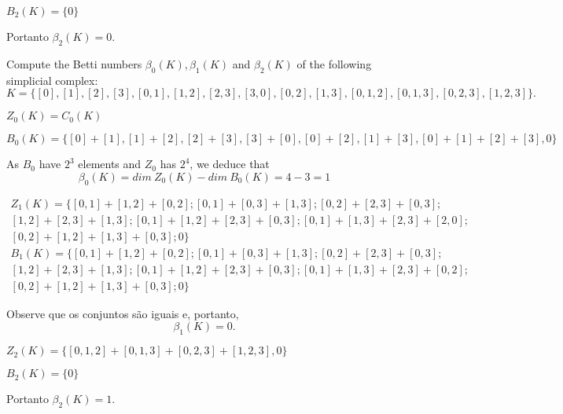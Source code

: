 $B_2(K) = \{0\}$

Portanto $\beta_2(K) = 0$. 

\noindent\linia

\begin{exercise}
    Compute the Betti numbers $\beta_0(K), \beta_1(K)$ and $\beta_2(K)$ of the
    following simplicial complex:
    $$
    K = \{[0], [1], [2], [3], [0, 1], [1, 2], [2, 3], [3, 0], [0, 2], [1, 3], [0, 1, 2], [0, 1, 3], [0, 2, 3], [1, 2, 3]\}.
    $$
\end{exercise}

$Z_0(K) = C_0(K)$

$B_0(K) = \{[0] + [1], [1] + [2], [2] + [3], [3] + [0], [0] + [2], [1] + [3],
[0] + [1] + [2] + [3], 0\}$

As $B_0$ have $2^3$ elements and $Z_0$ has $2^4$, we deduce that 
$$\beta_0(K) = dim ~Z_0(K) - dim ~B_0(K) = 4 - 3 = 1$$

\begin{multline}
    Z_1(K) = \{[0,1] + [1,2] + [0,2]; [0,1] + [0,3] + [1,3]; [0,2] + [2,3] +
    [0,3]; \\ 
    [1,2] + [2,3] + [1,3]; [0,1] + [1,2] + [2,3] + [0,3]; [0,1] + [1,3] + [2,3] + [2,0]; \\
    [0,2] + [1,2] + [1,3] + [0,3]; 0
    \}    
\end{multline}
\begin{multline}
    B_1(K) = \{[0,1] + [1,2] + [0,2]; [0,1] + [0,3] + [1,3]; [0,2] + [2,3] +
    [0,3]; \\ 
    [1,2] + [2,3] + [1,3]; 
    [0,1] + [1,2] + [2,3] + [0,3]; [0,1] + [1,3] + [2,3] + [0,2]; \\
    [0,2] + [1,2] + [1,3] + [0,3]; 0
    \}    
\end{multline}

Observe que os conjuntos são iguais e, portanto, 
$$\beta_1(K) = 0.$$

$Z_2(K) = \{[0,1,2] +[0,1,3] + [0,2,3] + [1,2,3], 0\}$

$B_2(K) = \{0\}$

Portanto $\beta_2(K) = 1$. 